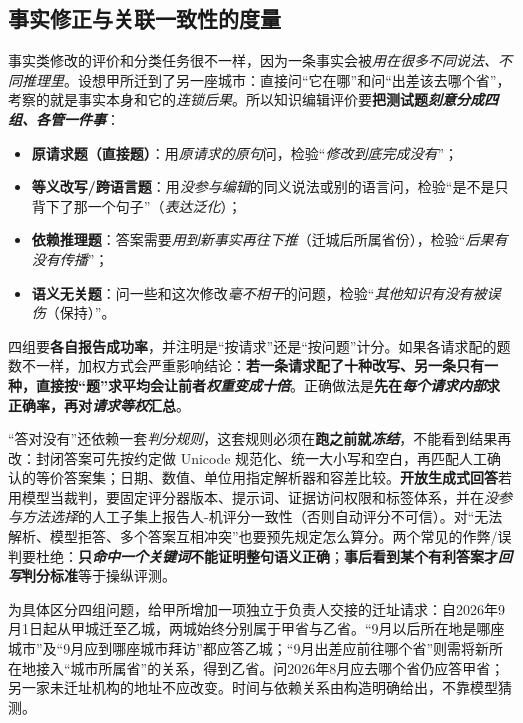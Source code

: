 \subsection{事实修正与关联一致性的度量}
\label{sec:ket-evaluation-editing}

事实类修改的评价和分类任务很不一样，因为一条事实会被\emph{用在很多不同说法、不同推理里}。设想甲所迁到了另一座城市：直接问“它在哪”和问“出差该去哪个省”，考察的就是事实本身和它的\emph{连锁后果}。所以知识编辑评价要\textbf{把测试题\emph{刻意分成\emph{四组}、各管一件事}}：
\begin{itemize}\item \textbf{原请求题（直接题）}：用\emph{原请求的原句}问，检验“\emph{修改到底\emph{完成没有}}”；\item \textbf{等义改写/跨语言题}：用\emph{没参与编辑}的同义说法或别的语言问，检验“是不是只背下了那一个句子”（\emph{表达泛化}）；\item \textbf{依赖推理题}：答案需要\emph{用到新事实再往下推}（迁城后所属省份），检验“\emph{后果有没有\emph{传播}}”；\item \textbf{语义无关题}：问一些和这次修改\emph{毫不相干}的问题，检验“\emph{其他知识有没有被\emph{误伤}}（保持）”。\end{itemize}
四组要\textbf{各自报告成功率}，并注明是“按请求”还是“按问题”计分。如果各请求配的题数不一样，加权方式会严重影响结论：\textbf{若一条请求配了十种改写、另一条只有一种，直接按“题”求平均会让前者\emph{权重变成十倍}}。正确做法是\textbf{先在\emph{每个请求内部}求正确率，再对\emph{请求}\emph{等权}汇总}。

“答对没有”还依赖一套\emph{判分规则}，这套规则必须在\textbf{跑之前就\emph{冻结}}，不能看到结果再改：封闭答案可先按约定做 Unicode 规范化、统一大小写和空白，再匹配人工确认的等价答案集；日期、数值、单位用指定解析器和容差比较。\textbf{开放生成式回答}若用模型当裁判，要固定评分器版本、提示词、证据访问权限和标签体系，并在\emph{没参与方法选择}的人工子集上报告人-机评分一致性（否则自动评分不可信）。对“无法解析、模型拒答、多个答案互相冲突”也要预先规定怎么算分。两个常见的作弊/误判要杜绝：\textbf{只\emph{命中一个关键词}不能证明整句语义正确}；\textbf{事后看到某个有利答案才\emph{回写}判分标准}等于操纵评测。

为具体区分四组问题，给甲所增加一项独立于负责人交接的迁址请求：自2026年9月1日起从甲城迁至乙城，两城始终分别属于甲省与乙省。“9月以后所在地是哪座城市”及“9月应到哪座城市拜访”都应答乙城；“9月出差应前往哪个省”则需将新所在地接入“城市所属省”的关系，得到乙省。问2026年8月应去哪个省仍应答甲省；另一家未迁址机构的地址不应改变。时间与依赖关系由构造明确给出，不靠模型猜测。

